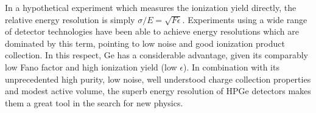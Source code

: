 In a hypothetical experiment which measures the ionization yield directly, the relative energy resolution is simply $\sigma/E = \sqrt{F\epsilon}$. Experiments using a wide range of detector technologies have been able to achieve energy resolutions which are dominated by this term, pointing to low noise and good ionization product collection. In this respect, Ge has a considerable advantage, given its comparably low Fano factor and high ionization yield (low $\epsilon$). In combination with its unprecedented high purity, low noise, well understood charge collection properties and modest active volume, the superb energy resolution of HPGe detectors makes them a great tool in the search for new physics.
